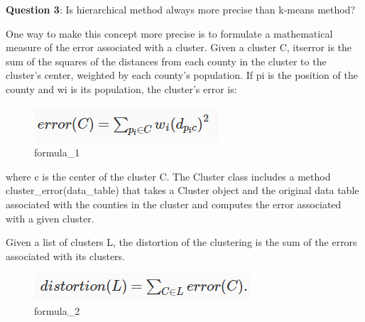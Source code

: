 \documentclass[11pt]{article}
\makeatletter
\def\maxwidth{\ifdim\Gin@nat@width>\linewidth\linewidth
    \else\Gin@nat@width\fi}
\let\Oldincludegraphics\includegraphics
\renewcommand{\includegraphics}[1]{\Oldincludegraphics[width=.8\maxwidth]{#1}}
\makeatother
\begin{document}
    \textbf{Question 3}: Is hierarchical method always more precise than
k-means method?

    One way to make this concept more precise is to formulate a mathematical
measure of the error associated with a cluster. Given a cluster C,
itserror is the sum of the squares of the distances from each county in
the cluster to the cluster's center, weighted by each county's
population. If pi is the position of the county and wi is its
population, the cluster's error is:

\begin{figure}
\centering
\includegraphics{img/formula_1.png}
\caption{formula\_1}
\end{figure}

where c is the center of the cluster C. The Cluster class includes a
method cluster\_error(data\_table) that takes a Cluster object and the
original data table associated with the counties in the cluster and
computes the error associated with a given cluster.

Given a list of clusters L, the distortion of the clustering is the sum
of the errors associated with its clusters.

\begin{figure}
\centering
\includegraphics{img/formula_2.png}
\caption{formula\_2}
\end{figure}
\end{document}
